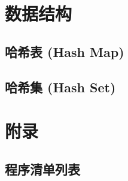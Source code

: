 \documentclass{crbook}
\begin{document}
\newpage
\section{数据结构}
\subsection{哈希表 (Hash Map)}

\subsection{哈希集 (Hash Set)}

\newpage
\section{附录}
\subsection{程序清单列表}
\makeatletter
{}
\makeatother
\end{document}
